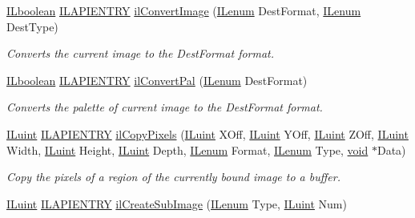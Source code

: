 \begin{DoxyCompactItemize}
\hyperlink{group__il__types_gaa6aa7c95cfdc06b4d8601ef832b7bb0a}{I\+Lboolean} \hyperlink{_i_l_8h_a69c08a8d06df986f7e46f209d131ef2f}{I\+L\+A\+P\+I\+E\+N\+T\+R\+Y} \hyperlink{group__image__manip_ga82b125402ed12ed399f181165374a7c1}{il\+Convert\+Image} (\hyperlink{group__il__types_ga62ca73445716183ef42b1f3906a45ed0}{I\+Lenum} Dest\+Format, \hyperlink{group__il__types_ga62ca73445716183ef42b1f3906a45ed0}{I\+Lenum} Dest\+Type)
\begin{DoxyCompactList}\small\item\em Converts the current image to the Dest\+Format format. \end{DoxyCompactList}\item 
\hyperlink{group__il__types_gaa6aa7c95cfdc06b4d8601ef832b7bb0a}{I\+Lboolean} \hyperlink{_i_l_8h_a69c08a8d06df986f7e46f209d131ef2f}{I\+L\+A\+P\+I\+E\+N\+T\+R\+Y} \hyperlink{group__image__manip_gaf3e055a50d9dcc791b249bfd6152ba58}{il\+Convert\+Pal} (\hyperlink{group__il__types_ga62ca73445716183ef42b1f3906a45ed0}{I\+Lenum} Dest\+Format)
\begin{DoxyCompactList}\small\item\em Converts the palette of current image to the Dest\+Format format. \end{DoxyCompactList}\item 
\hyperlink{group__il__types_gaff8e86a1072c8d7cfe387fb87c6ed8e1}{I\+Luint} \hyperlink{_i_l_8h_a69c08a8d06df986f7e46f209d131ef2f}{I\+L\+A\+P\+I\+E\+N\+T\+R\+Y} \hyperlink{group__image__manip_gaa1410977695d1633907ff371e5b9c77e}{il\+Copy\+Pixels} (\hyperlink{group__il__types_gaff8e86a1072c8d7cfe387fb87c6ed8e1}{I\+Luint} X\+Off, \hyperlink{group__il__types_gaff8e86a1072c8d7cfe387fb87c6ed8e1}{I\+Luint} Y\+Off, \hyperlink{group__il__types_gaff8e86a1072c8d7cfe387fb87c6ed8e1}{I\+Luint} Z\+Off, \hyperlink{group__il__types_gaff8e86a1072c8d7cfe387fb87c6ed8e1}{I\+Luint} Width, \hyperlink{group__il__types_gaff8e86a1072c8d7cfe387fb87c6ed8e1}{I\+Luint} Height, \hyperlink{group__il__types_gaff8e86a1072c8d7cfe387fb87c6ed8e1}{I\+Luint} Depth, \hyperlink{group__il__types_ga62ca73445716183ef42b1f3906a45ed0}{I\+Lenum} Format, \hyperlink{group__il__types_ga62ca73445716183ef42b1f3906a45ed0}{I\+Lenum} Type, \hyperlink{_i_l_8h_a5530e04d947bcddd83639ea7940faf10}{void} $\ast$Data)
\begin{DoxyCompactList}\small\item\em Copy the pixels of a region of the currently bound image to a buffer. \end{DoxyCompactList}\item 
\hyperlink{group__il__types_gaff8e86a1072c8d7cfe387fb87c6ed8e1}{I\+Luint} \hyperlink{_i_l_8h_a69c08a8d06df986f7e46f209d131ef2f}{I\+L\+A\+P\+I\+E\+N\+T\+R\+Y} \hyperlink{group__image__manip_gabc158c1aed9358ad456527f7cdb03446}{il\+Create\+Sub\+Image} (\hyperlink{group__il__types_ga62ca73445716183ef42b1f3906a45ed0}{I\+Lenum} Type, \hyperlink{group__il__types_gaff8e86a1072c8d7cfe387fb87c6ed8e1}{I\+Luint} Num)

\end{DoxyCompactItemize}
